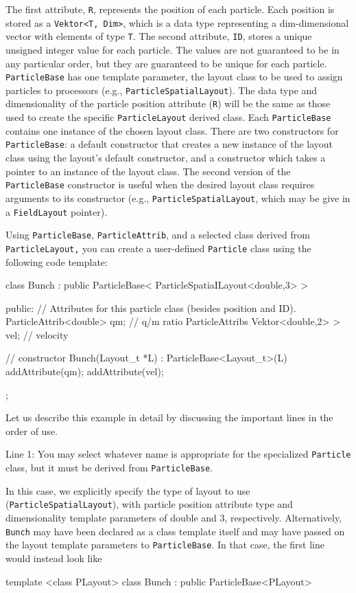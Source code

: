 The first attribute, \texttt{R}, represents the position of each particle. Each position is stored as a \texttt{Vektor<T, Dim>}, which is a \ippl data type representing a dim-dimensional vector with elements of type \texttt{T}. The second attribute, \texttt{ID}, stores a unique unsigned integer value for each particle. The values are not guaranteed to be in any particular order, but they are guaranteed to be unique for each particle. \texttt{ParticleBase} has one template parameter, the layout class to be used to assign particles
to processors (e.g., \texttt{ParticleSpatialLayout}). The data type and dimensionality of the particle position attribute (\texttt{R}) will be the same as those used to create the specific \texttt{ParticleLayout} derived class. Each \texttt{ParticleBase} contains one instance of the chosen layout class. There are two constructors for \texttt{ParticleBase}: a default constructor that creates a new instance of the layout class using the layout's default constructor, and a constructor which takes a pointer to an instance of the
layout class. The second version of the \texttt{ParticleBase} constructor is useful when the desired layout class requires arguments to its constructor (e.g., \texttt{ParticleSpatialLayout}, which may be give in a \texttt{FieldLayout} pointer).

Using \texttt{ParticleBase}, \texttt{ParticleAttrib}, and a selected class derived from \texttt{ParticleLayout,} you can create a user-defined \texttt{Particle} class using the following code template: \\
\clearpage
\begin{codeln}
class Bunch : public ParticleBase< ParticleSpatiaILayout<double,3> >
{
public:
    // Attributes for this particle class (besides position and ID).
    ParticleAttrib<double>             qm;      // q/m ratio
    ParticleAttribs Vektor<double,2> > vel; 	// velocity

    // constructor
    Bunch(Layout\_t *L) : ParticleBase<Layout\_t>(L) {
        addAttribute(qm);
        addAttribute(vel);
    }
};
\end{codeln}

Let us describe this example in detail by discussing the important lines in the order of use.

Line 1: You may select whatever name is appropriate for the specialized \texttt{Particle} class, but it must be derived from \texttt{ParticleBase}.

In this case, we explicitly specify the type of layout to use (\texttt{ParticleSpatialLayout}), with particle position attribute type and dimensionality template parameters of double and 3, respectively. Alternatively, \texttt{Bunch} may have been declared as a class template itself and may have passed on the layout template parameters to \texttt{ParticleBase}. In that case, the first line would instead look like
\begin{smallcode}
template <class PLayout>
class Bunch : public ParticleBase<PLayout>
\end{smallcode}

